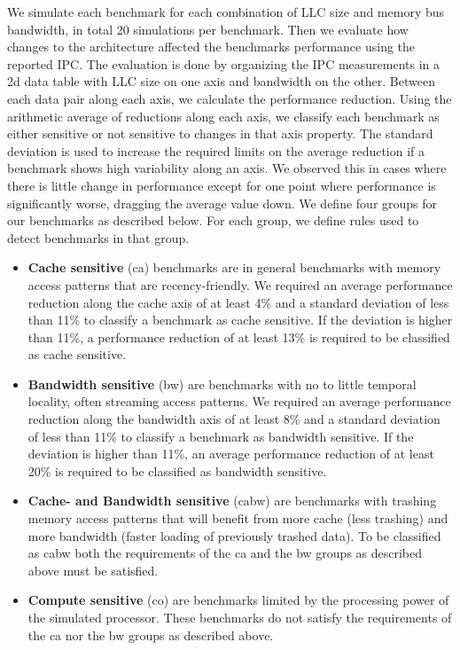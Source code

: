 We simulate each benchmark for each combination of LLC size and memory bus bandwidth, in total 20 simulations per benchmark.
Then we evaluate how changes to the architecture affected the benchmarks performance using the reported IPC.
The evaluation is done by organizing the IPC measurements in a 2d data table with LLC size on one axis and bandwidth on the other.
Between each data pair along each axis, we calculate the performance reduction.
Using the arithmetic average of reductions along each axis, we classify each benchmark as either sensitive or not sensitive to changes in that axis property.
The standard deviation is used to increase the required limits on the average reduction if a benchmark shows high variability along an axis.
We observed this in cases where there is little change in performance except for one point where performance is significantly worse, dragging the average value down.
We define four groups for our benchmarks as described below.
For each group, we define rules used to detect benchmarks in that group.
\begin{itemize}

\item \textbf{Cache sensitive} (ca) benchmarks are in general benchmarks with memory access patterns that are recency-friendly. We required an average performance reduction along the cache axis of at least 4\% and a standard deviation of less than 11\% to classify a benchmark as cache sensitive. If the deviation is higher than 11\%, a performance reduction of at least 13\% is required to be classified as cache sensitive.

\item \textbf{Bandwidth sensitive} (bw) are benchmarks with no to little temporal locality, often streaming access patterns. We required an average performance reduction along the bandwidth axis of at least 8\% and a standard deviation of less than 11\% to classify a benchmark as bandwidth sensitive. If the deviation is higher than 11\%, an average performance reduction of at least 20\% is required to be classified as bandwidth sensitive. 

\item \textbf{Cache- and Bandwidth sensitive} (cabw) are benchmarks with trashing memory access patterns that will benefit from more cache (less trashing) and more bandwidth (faster loading of previously trashed data). To be classified as cabw both the requirements of the ca and the bw groups as described above must be satisfied.

\item \textbf{Compute sensitive} (co) are benchmarks limited by the processing power of the simulated processor. These benchmarks do not satisfy the requirements of the ca nor the bw groups as described above.

\end{itemize}

